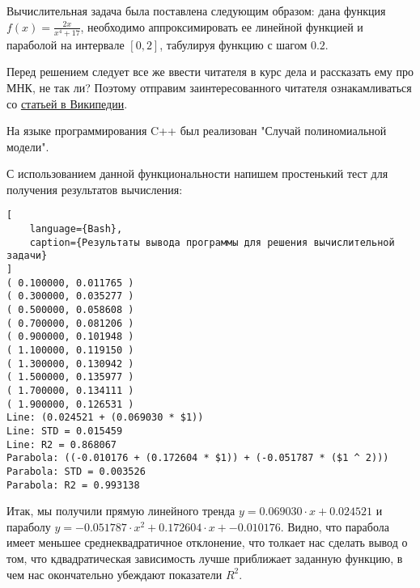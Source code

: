 \documentclass{article}
\begin{document}
Вычислительная задача была поставлена следующим образом:
дана функция $f(x) = \frac{2x}{x^4+17}$, необходимо аппроксимировать
ее линейной функцией и параболой на интервале $[0, 2]$, табулируя
функцию с шагом $0.2$.

Перед решением следует все же ввести читателя в курс дела и рассказать
ему про МНК, не так ли? Поэтому отправим заинтересованного читателя
ознакамливаться со \href{https://ru.wikipedia.org/wiki/%D0%9C%D0%B5%D1%82%D0%BE%D0%B4_%D0%BD%D0%B0%D0%B8%D0%BC%D0%B5%D0%BD%D1%8C%D1%88%D0%B8%D1%85_%D0%BA%D0%B2%D0%B0%D0%B4%D1%80%D0%B0%D1%82%D0%BE%D0%B2}{статьей в Википедии}.

На языке программирования C++ был реализован "Случай полиномиальной модели".



С использованием данной функциональности напишем простенький
тест для получения результатов вычисления:




\begin{lstlisting}[
    language={Bash},
    caption={Результаты вывода программы для решения вычислительной задачи}
]
( 0.100000, 0.011765 )
( 0.300000, 0.035277 )
( 0.500000, 0.058608 )
( 0.700000, 0.081206 )
( 0.900000, 0.101948 )
( 1.100000, 0.119150 )
( 1.300000, 0.130942 )
( 1.500000, 0.135977 )
( 1.700000, 0.134111 )
( 1.900000, 0.126531 )
Line: (0.024521 + (0.069030 * $1))
Line: STD = 0.015459
Line: R2 = 0.868067
Parabola: ((-0.010176 + (0.172604 * $1)) + (-0.051787 * ($1 ^ 2)))
Parabola: STD = 0.003526
Parabola: R2 = 0.993138
\end{lstlisting}

Итак, мы получили прямую линейного тренда
$y = 0.069030 \cdot x + 0.024521$ и
параболу $y = -0.051787 \cdot x ^ 2 +
    0.172604 \cdot x + -0.010176$. Видно, что
парабола имеет меньшее среднеквадратичное
отклонение, что толкает нас сделать вывод
о том, что кдвадратическая зависимость
лучше приближает заданную функцию, в чем
нас окончательно убеждают показатели
$R^2$.
\end{document}
